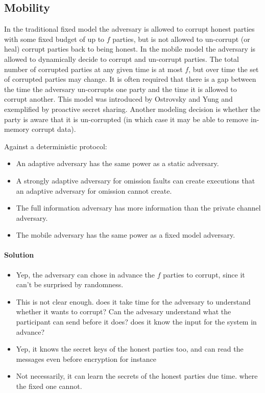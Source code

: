 \subsection{Mobility}
In the traditional fixed model the adversary is allowed to corrupt honest parties with 
some fixed budget of up to $f$ parties, but is not allowed to un-corrupt (or heal) 
corrupt parties back to being honest. 
In the mobile model the adversary is allowed to dynamically decide to 
corrupt and un-corrupt parties. 
The total number of corrupted parties at any given time is at most $f$, 
but over time the set of corrupted parties may change. 
It is often required that there is a gap between the time the adversary un-corrupts one party and 
the time it is allowed to corrupt another. 
This model was introduced by Ostrovsky and Yung and exemplified by proactive secret sharing. 
Another modeling decision is whether the party is aware that it is un-corrupted (in which case it may 
be able to remove in-memory corrupt data).




\begin{xca}
    Against a deterministic protocol:
    \begin{itemize} 
        \item An adaptive adversary has the same power as a static adversary.
        \item A strongly adaptive adversary for omission faults can create executions 
        that an adaptive adversary for omission cannot create.
        \item The full information adversary has more information than the private channel adversary.
        \item The mobile adversary has the same power as a fixed model adversary.
\end{itemize}
    
\paragraph{Solution}
\begin{itemize}
    \item Yep, the adversary can chose in advance the $f$ parties to corrupt, since it can't be surprised by randomness.
    \item This is not clear enough. does it take time for the adversary to understand whether it wants to corrupt? 
    Can the advesary understand what the participant can send before it does? does it know the input for the system 
    in advance?
    \item Yep, it knows the secret keys of the honest parties too, and can read the messages even before encryption for instance
    \item Not necessarily, it can learn the secrets of the honest parties due time. where the fixed one cannot.
\end{itemize}
\end{xca}



